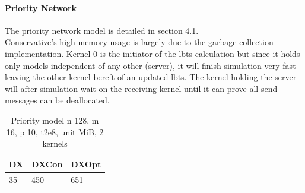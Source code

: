\paragraph*{Priority Network}
The priority network model is detailed in section 4.1.\\
Conservative's high memory usage is largely due to the garbage collection implementation. Kernel 0 is the initiator of the lbts calculation but since it holds only models independent of any other (server), it will finish simulation very fast leaving the other kernel bereft of an updated lbts. The kernel holding the server will after simulation wait on the receiving kernel until it can prove all send messages can be deallocated.
\begin{table}[lhtb]
	\centering
	\caption{Priority model n 128, m 16, p 10,  t2e8, unit MiB, 2 kernels}
	\label{pmod_mem}
	\begin{tabular}{| l | l | l |}
		\hline
		DX &DXCon &DXOpt\\ \hline
		35 & 450 & 651\\ \hline
	\end{tabular}
\end{table}
